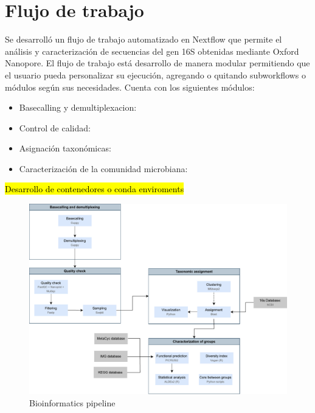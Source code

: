 \section{Flujo de trabajo}
Se desarrolló un flujo de trabajo automatizado en Nextflow que permite el análisis y caracterización de secuencias del gen 16S obtenidas mediante Oxford Nanopore. El flujo de trabajo está desarrollo de manera modular permitiendo que el usuario pueda personalizar su ejecución, agregando o quitando subworkflows o módulos según sus necesidades. Cuenta con los siguientes módulos:
\begin{itemize}
    \item Basecalling y demultiplexacion:
    \item Control de calidad:
    \item Asignación taxonómicas:
    \item Caracterización de la comunidad microbiana:
\end{itemize}
\hl{Desarrollo de contenedores o conda enviroments}
\begin{figure}[H]
    \centering
    \includegraphics[width=1\linewidth]{images/pipeline.pdf}
    \caption{Bioinformatics pipeline}
    \label{fig:pipeline}
\end{figure}
